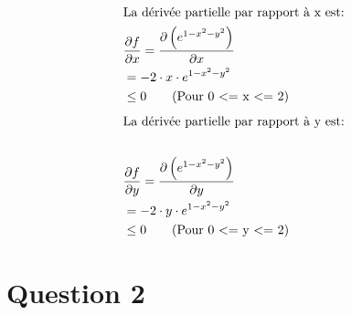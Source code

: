 \documentclass[letterpaper,12pt,oneside,final]{book}
\begin{document}
\begin{enumerate}[a)]
\begin{align*}
    \intertext{La dérivée partielle par rapport à x est: }
    &\frac{\partial f}{\partial x} = \frac{\partial \left(e^{1-x^2-y^2}\right)}{\partial x} \\
    &= -2 \cdot x \cdot e^{1-x^2-y^2} \\
    &\leq 0 \qquad \text{(Pour 0 <= x <= 2)} \\
\end{align*}
\begin{align*}
    \intertext{La dérivée partielle par rapport à y est: } \\
    &\frac{\partial f}{\partial y} = \frac{\partial \left(e^{1-x^2-y^2}\right)}{\partial y} \\
    &= -2 \cdot y \cdot e^{1-x^2-y^2} \\
    &\leq 0 \qquad \text{(Pour 0 <= y <= 2)}
\end{align*}

\end{enumerate}


\newpage \section*{Question 2}
\end{document}
